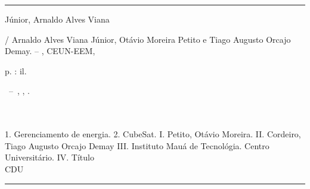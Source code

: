 \documentclass[
	12pt,				%
	openright,			%
	oneside,			%
	a4paper,			%
	english,			%
	french,				%
	spanish,			%
	brazil,				%
	oldfontcommands
	]{abntex2}
\begin{document}
\frenchspacing 

\imprimircapa

\imprimirfolhaderosto*


%
%     
\begin{fichacatalografica}
	\vspace*{\fill}					%
	\hrule							%
	\begin{center}					%
	\begin{minipage}[c]{12.5cm}		%
	
	Júnior, Arnaldo Alves Viana
	
	\hspace{0.5cm} \imprimirtitulo  / Arnaldo Alves Viana Júnior, Otávio Moreira Petito e Tiago Augusto Orcajo Demay. --
	\imprimirlocal, CEUN-EEM, \imprimirdata
	
	\hspace{0.5cm} \pageref{LastPage} p. : il. \\
	
	\hspace{0.5cm}
	\parbox[t]{\textwidth}{\imprimirtipotrabalho~--~\imprimirinstituicao,
	\imprimirlocal, \imprimirdata.}\\
	
	\hspace{0.5cm} \imprimirorientadorRotulo~\imprimirorientador\\
	
	\hspace{0.5cm}
		1. Gerenciamento de energia.
		2. CubeSat.
		I. Petito, Otávio Moreira.
		II. Cordeiro, Tiago Augusto Orcajo Demay
		III. Instituto Mauá de Tecnológia. Centro Universitário.
		IV. Título\\ 			
	
	\hspace{8.75cm} CDU \\
	
	\end{minipage}
	\end{center}
	\hrule
\end{fichacatalografica}
\end{document}
